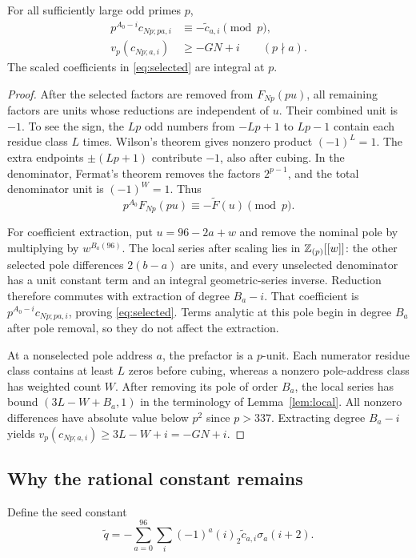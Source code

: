 \begin{lemma}\label{lem:dilation}
For all sufficiently large odd primes $p$,
\begin{align}
 p^{A_0-i}c_{Np;pa,i}&\equiv-\widetilde c_{a,i}\pmod p,
                                                       \label{eq:selected}\\
 v_p(c_{Np;a,i})&\ge-GN+i\qquad(p\nmid a).              \label{eq:other}
\end{align}
The scaled coefficients in \eqref{eq:selected} are integral at $p$.
\end{lemma}
\begin{proof}
After the selected factors are removed from $F_{Np}(pu)$, all remaining
factors are units whose reductions are independent of $u$. Their
combined unit is $-1$. To see the sign, the $Lp$ odd numbers from
$-Lp+1$ to $Lp-1$ contain each residue class $L$ times. Wilson's
theorem gives nonzero product $(-1)^L=1$. The extra endpoints
$\pm(Lp+1)$ contribute $-1$, also after cubing. In the denominator,
Fermat's theorem removes the factors $2^{p-1}$, and the total
denominator unit is $(-1)^W=1$. Thus
\begin{equation}\label{eq:function-congruence}
 p^{A_0}F_{Np}(pu)\equiv-\widetilde F(u)\pmod p.
\end{equation}

For coefficient extraction, put $u=96-2a+w$ and remove the nominal
pole by multiplying by $w^{B_a(96)}$. The local series after scaling
lies in $\mathbb Z_{(p)}[[w]]$: the other selected pole differences
$2(b-a)$ are units, and every unselected denominator has a unit
constant term and an integral geometric-series inverse. Reduction
therefore commutes with extraction of degree $B_a-i$. That coefficient
is $p^{A_0-i}c_{Np;pa,i}$, proving \eqref{eq:selected}.
Terms analytic at this pole begin in degree $B_a$ after pole removal,
so they do not affect the extraction.

At a nonselected pole address $a$, the prefactor is a $p$-unit.
Each numerator residue class contains at least $L$ zeros before
cubing, whereas a nonzero pole-address class has weighted count $W$.
After removing its pole of order $B_a$, the local series has bound
$(3L-W+B_a,1)$ in the terminology of Lemma~\ref{lem:local}.
All nonzero differences have absolute value below $p^2$ since
$p>337$. Extracting degree $B_a-i$ yields
$v_p(c_{Np;a,i})\ge3L-W+i=-GN+i$.
\end{proof}

\subsection{Why the rational constant remains}
Define the seed constant
\begin{equation}\label{eq:seed-constant}
 \widetilde q=-\sum_{a=0}^{96}\sum_i(-1)^a(i)_2
                          \widetilde c_{a,i}\sigma_a(i+2).
\end{equation}

